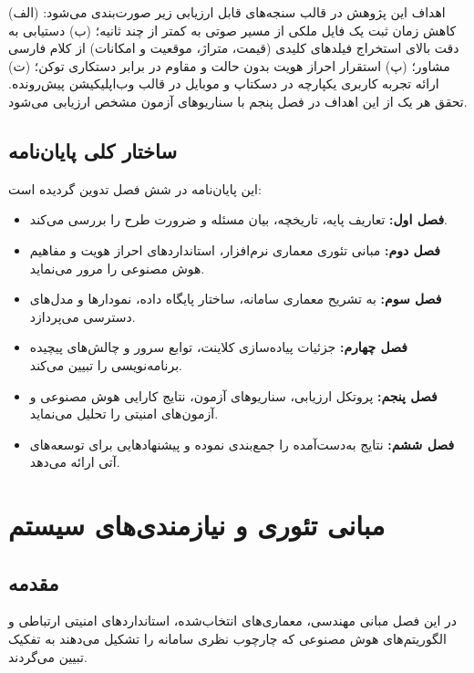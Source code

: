 \documentclass[11pt, a4paper]{report}
\begin{document}
اهداف این پژوهش در قالب سنجه‌های قابل ارزیابی زیر صورت‌بندی می‌شود: (الف) کاهش زمان ثبت یک فایل ملکی از مسیر صوتی به کمتر از چند ثانیه؛ (ب) دستیابی به دقت بالای استخراج فیلدهای کلیدی (قیمت، متراژ، موقعیت و امکانات) از کلام فارسی مشاور؛ (پ) استقرار احراز هویت بدون حالت و مقاوم در برابر دستکاری توکن؛ (ت) ارائه تجربه کاربری یکپارچه در دسکتاپ و موبایل در قالب وب‌اپلیکیشن پیش‌رونده. تحقق هر یک از این اهداف در فصل پنجم با سناریوهای آزمون مشخص ارزیابی می‌شود.

\section{ساختار کلی پایان‌نامه}
این پایان‌نامه در شش فصل تدوین گردیده است:
\begin{itemize}
    \item \textbf{فصل اول:} تعاریف پایه، تاریخچه، بیان مسئله و ضرورت طرح را بررسی می‌کند.
    \item \textbf{فصل دوم:} مبانی تئوری معماری نرم‌افزار، استانداردهای احراز هویت و مفاهیم هوش مصنوعی را مرور می‌نماید.
    \item \textbf{فصل سوم:} به تشریح معماری سامانه، ساختار پایگاه داده، نمودارها و مدل‌های دسترسی می‌پردازد.
    \item \textbf{فصل چهارم:} جزئیات پیاده‌سازی کلاینت، توابع سرور و چالش‌های پیچیده برنامه‌نویسی را تبیین می‌کند.
    \item \textbf{فصل پنجم:} پروتکل ارزیابی، سناریوهای آزمون، نتایج کارایی هوش مصنوعی و آزمون‌های امنیتی را تحلیل می‌نماید.
    \item \textbf{فصل ششم:} نتایج به‌دست‌آمده را جمع‌بندی نموده و پیشنهادهایی برای توسعه‌های آتی ارائه می‌دهد.
\end{itemize}

\chapter{مبانی تئوری و نیازمندی‌های سیستم}

\section{مقدمه}
در این فصل مبانی مهندسی، معماری‌های انتخاب‌شده، استانداردهای امنیتی ارتباطی و الگوریتم‌های هوش مصنوعی که چارچوب نظری سامانه را تشکیل می‌دهند به تفکیک تبیین می‌گردند.
\end{document}
